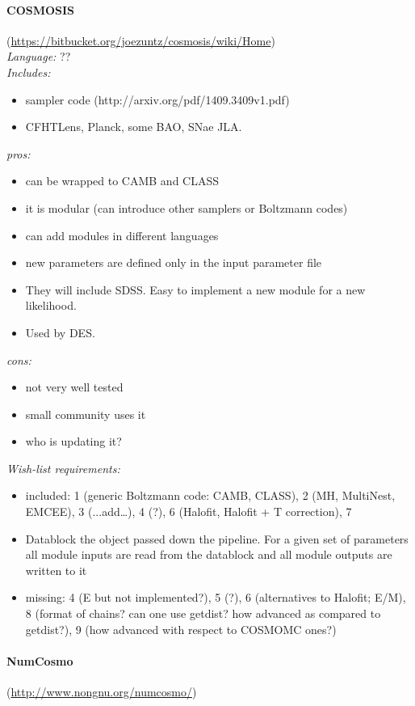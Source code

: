 \paragraph{COSMOSIS}(\url{https://bitbucket.org/joezuntz/cosmosis/wiki/Home})\\
{\it Language:} ??\\
{\it Includes: }
\begin{itemize}
 \item sampler code (http://arxiv.org/pdf/1409.3409v1.pdf)
 \item CFHTLens, Planck, some BAO, SNae JLA. 
\end{itemize}
{\it pros:} 
\begin{itemize}
 \item can be wrapped to CAMB and CLASS
 \item it is modular (can introduce other samplers or Boltzmann codes) 
 \item can add modules in different languages
 \item new parameters are defined only in the input parameter file
 \item They will include SDSS. Easy to implement a new module for a new likelihood.
 \item Used by DES.
\end{itemize}
{\it cons:} 
\begin{itemize}
 \item not very well tested
 \item small community uses it
 \item who is updating it?
\end{itemize}
{\it Wish-list requirements: }
\begin{itemize}
 \item included: 1 (generic Boltzmann code: CAMB, CLASS), 2 (MH, MultiNest, EMCEE), 3 (...add…), 4 (?), 6 (Halofit, Halofit + T correction), 7
 \item Datablock the object passed down the pipeline. For a given set of parameters all module inputs are read from the datablock and all module outputs are written to it 
 \item missing: 4 (E but not implemented?), 5 (?), 6 (alternatives to Halofit; E/M), 8 (format of chains? can one use getdist? how advanced as compared to getdist?), 9 (how advanced with respect to COSMOMC ones?) 
\end{itemize}
\paragraph{NumCosmo}(\url{http://www.nongnu.org/numcosmo/})\\




